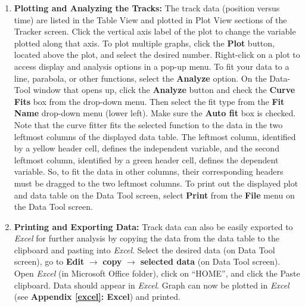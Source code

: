 \begin{enumerate}
\item {\bf Plotting and Analyzing the Tracks:} The track data (position versus time) are listed in the Table View and plotted in Plot View sections of the Tracker screen. Click the vertical axis label of the plot to change the variable plotted along that axis. To plot multiple graphs, click the {\bf Plot} button, located above the plot, and select the desired number. 
Right-click on a plot to access display and analysis options in a pop-up menu. To fit your data to a line, parabola, or other functions, select the {\bf Analyze} option. On the Data-Tool window that opens up, click the {\bf Analyze} button and check the {\bf Curve Fits} box from the drop-down menu. Then select the fit type from the {\bf Fit Name} drop-down menu (lower left). Make sure the {\bf Auto fit} box is checked. 
Note that the curve fitter fits the selected function to the data in the two leftmost columns of the displayed data table. The leftmost column, identified by a yellow header cell, defines the independent variable, and the second leftmost column, identified by a green header cell, defines the dependent variable. So, to fit the data in other columns, their corresponding headers must be dragged to the two leftmost columns. To print out the displayed plot and data table on the Data Tool screen, select {\bf Print} from the {\bf File} menu on the Data Tool screen.

\item {\bf Printing and Exporting Data:} Track data can also be easily exported to \textit{Excel} for further analysis by copying the data from the data table to the clipboard and pasting into \textit{Excel}. 
Select the desired data (on Data Tool screen), go to {\bf Edit} $\rightarrow$ {\bf copy} $\rightarrow$ {\bf selected data} (on Data Tool screen). 
Open \textit{Excel} (in Microsoft Office folder), click on ``HOME'', and click the Paste clipboard. Data should appear in \textit{Excel}. Graph can now be plotted in \textit{Excel} (see \textbf{Appendix \ref{excel}: Excel}) and printed.
\end{enumerate}

